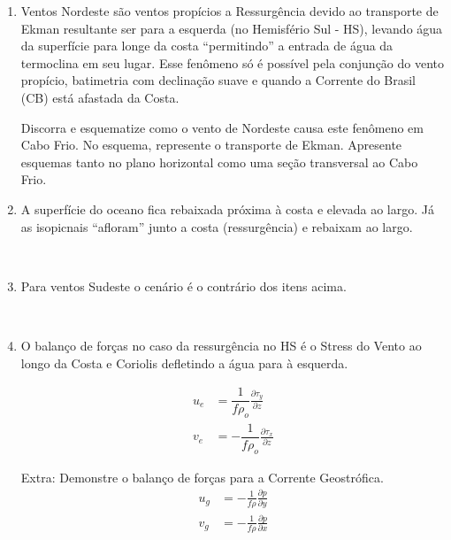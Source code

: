 \documentclass[12pt,portuguese,a4paper,pdftex]{article}
\newcommand{\pd}[2]{\frac{\partial #1}{\partial #2}} %
\begin{document}
\begin{enumerate}
  \item Ventos Nordeste são ventos propícios a Ressurgência devido ao transporte
        de Ekman resultante ser para a esquerda (no Hemisfério Sul - HS), levando
        água da superfície para longe da costa ``permitindo'' a entrada de água
        da termoclina em seu lugar.  Esse fenômeno só é possível pela conjunção
        do vento propício, batimetria com declinação suave e quando a
        Corrente do Brasil (CB) está afastada da Costa.

        Discorra e esquematize como o vento de Nordeste causa este fenômeno em
        Cabo Frio.  No esquema, represente o transporte de Ekman.  Apresente
        esquemas tanto no plano horizontal como uma seção transversal ao Cabo Frio.

  \item A superfície do oceano fica rebaixada próxima à costa e elevada ao
        largo.  Já as isopicnais ``afloram'' junto a costa (ressurgência) e
        rebaixam ao largo.

  \begin{figure}[H]
    \centering
    \mbox{
    \quad
    }
  \end{figure}

  \clearpage

  \item Para ventos Sudeste o cenário é o contrário dos itens acima.

  \begin{figure}[H]
    \centering
    \mbox{
    \quad
    }
  \end{figure}

  \item O balanço de forças no caso da ressurgência no HS é o Stress do Vento ao
        longo da Costa e Coriolis defletindo a água para à esquerda.

        \begin{align*}
          u_e &= \dfrac{1}{f\rho_{o}}\pd{\tau_y}{z} \\
          v_e &= -\dfrac{1}{f\rho_{o}}\pd{\tau_x}{z}
        \end{align*}


  \item[Extra:] Demonstre o balanço de forças para a Corrente Geostrófica.
        \begin{align*}
          u_g &= -\frac{1}{f\rho}\pd{p}{y} \\
          v_g &= -\frac{1}{f\rho}\pd{p}{x}
        \end{align*}

  \begin{figure}[H]
  \end{figure}
\end{enumerate}
\end{document}
